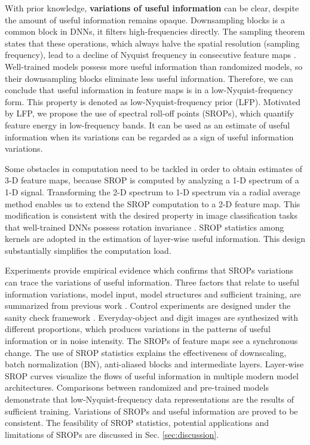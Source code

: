 \documentclass{article}
\begin{document}
With prior knowledge, \textbf{variations of useful information} can be clear, despite the amount of useful information remains opaque. Downsampling blocks is a common block in DNNs, it filters high-frequencies directly. The sampling theorem states that these operations, which always halve the spatial resolution (sampling frequency), lead to a decline of Nyquist frequency in consecutive feature maps \cite{cover,shannon}. Well-trained models possess more useful information than randomized models, so their downsampling blocks eliminate less useful information. Therefore, we can conclude that useful information in feature maps is in a low-Nyquist-frequency form. This property is denoted as low-Nyquist-frequency prior (LFP). Motivated by LFP, we propose the use of spectral roll-off points (SROPs), which quantify feature energy in low-frequency bands. It can be used as an estimate of useful information when its variations can be regarded as a sign of useful information variations. 

Some obstacles in computation need to be tackled in order to obtain estimates of 3-D feature maps, because SROP is computed by analyzing a 1-D spectrum of a 1-D signal. Transforming the 2-D spectrum to 1-D spectrum via a radial average method enables us to extend the SROP computation to a 2-D feature map. This modification is consistent with the desired property in image classification tasks that well-trained DNNs possess rotation invariance \cite{rt_invar_3,rt_invar_2,rt_invar_1}. SROP statistics among kernels are adopted in the estimation of layer-wise useful information. This design substantially simplifies the computation load.

Experiments provide empirical evidence which confirms that SROPs variations can trace the variations of useful information. Three factors that relate to useful information variations, model input, model structures and sufficient training, are summarized from previous work \cite{rt_invar_2,Understanding,why_useful,Yak2019TowardsTA}. Control experiments are designed under the sanity check framework \cite{Sanity_Checks_for_Saliency_Maps}. Everyday-object and digit images are synthesized with different proportions, which produces variations in the patterns of useful information or in noise intensity. The SROPs of feature maps see a synchronous change. The use of SROP statistics explains the effectiveness of downscaling, batch normalization (BN), anti-aliased blocks and intermediate layers. Layer-wise SROP curves visualize the flows of useful information in multiple modern model architectures. Comparisons between randomized and pre-trained models demonstrate that low-Nyquist-frequency data representations are the results of sufficient training. Variations of SROPs and useful information are proved to be consistent. The feasibility of SROP statistics, potential applications and limitations of SROPs are discussed in Sec. \ref{sec:discussion}.
\end{document}
